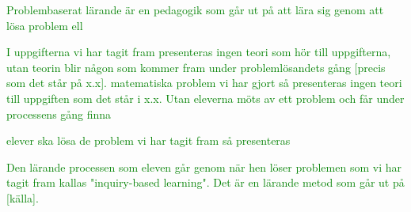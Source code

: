 \textcolor{green}{Problembaserat lärande är en pedagogik som går ut på att lära sig genom att lösa problem ell


I uppgifterna vi har tagit fram presenteras ingen teori som hör till uppgifterna, utan teorin blir någon som kommer fram under problemlösandets gång [precis som det står på x.x]. matematiska problem vi har gjort så presenteras ingen teori till uppgiften som det står i x.x. Utan eleverna möts av ett problem och får under processens gång finna}

\textcolor{green}{elever ska lösa de problem vi har tagit fram så presenteras}

\textcolor{green}{Den lärande processen som eleven går genom när hen löser problemen som vi har tagit fram kallas "inquiry-based learning". Det är en lärande metod som går ut på [källa].}

%
%
%
